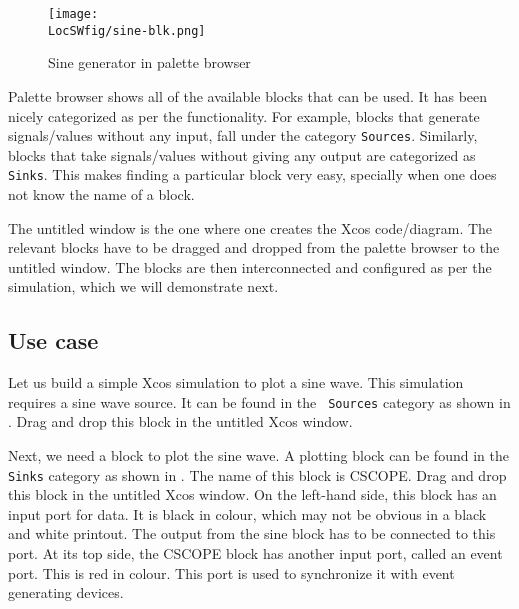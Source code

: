 \begin{figure}
      \centering
      \texttt{[image: \\LocSWfig/sine-blk.png]}
      \caption{Sine generator in palette browser}
      \label{sine-blk}
\end{figure}




Palette browser shows all of the available blocks that can be used. It
has been nicely categorized as per the functionality. For example,
blocks that generate signals/values without any input, fall under the
category {\tt Sources}. Similarly, blocks that take signals/values
without giving any output are categorized as {\tt Sinks}. This makes
finding a particular block very easy, specially when one does not know
the name of a block.

The untitled window is the one where one creates the Xcos
code/diagram. The relevant blocks have to be dragged and dropped from
the palette browser to the untitled window. The blocks are then
interconnected and configured as per the simulation, which we will
demonstrate next.

\subsection{Use case}
Let us build a simple Xcos simulation to plot a sine wave. This
simulation requires a sine wave source. It can be found in the {\tt
            Sources} category as shown in . Drag and drop this
block in the untitled Xcos window. 

Next, we need a block to plot the sine wave. A plotting block can be
found in the {\tt Sinks} category as shown in . The
name of this block is CSCOPE. Drag and drop this block in the untitled
Xcos window.  On the left-hand side, this block has an input port for
data.  It is black in colour, which may not be obvious in a black and
white printout.  The output from the sine block has to be connected
to this port.  At its top side, the CSCOPE block has another input
port, called an event port.  This is red in colour.  This port is used
to synchronize it with event generating devices.

